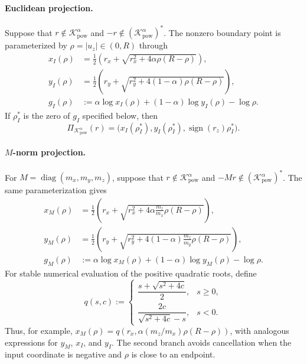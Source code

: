 \documentclass[letterpaper]{article} %
\theoremstyle{definition}
\theoremstyle{remark}
\begin{document}
\paragraph{Euclidean projection.}
Suppose that $r\notin\mathcal K_{\mathrm{pow}}^\alpha$ and
$-r\notin(\mathcal K_{\mathrm{pow}}^\alpha)^*$.
The nonzero boundary point is parameterized by
$\rho=|u_z|\in(0,R)$ through
\begin{equation}
\label{eq:power-euclidean-projection}
\begin{aligned}
    x_I(\rho)
    &=\frac12\left(
        r_x+\sqrt{r_x^2+4\alpha\rho(R-\rho)}
      \right),\\
    y_I(\rho)
    &=\frac12\left(
        r_y+\sqrt{r_y^2+4(1-\alpha)\rho(R-\rho)}
      \right),\\
    g_I(\rho)
    &:=\alpha\log x_I(\rho)
      +(1-\alpha)\log y_I(\rho)-\log\rho.
\end{aligned}
\end{equation}
If $\rho_I^*$ is the zero of $g_I$ specified below, then
\begin{equation}
\label{eq:power-euclidean-projection-recovery}
    \Pi_{\mathcal K_{\mathrm{pow}}^\alpha}(r)
    =\bigl(x_I(\rho_I^*),y_I(\rho_I^*),
      \operatorname{sign}(r_z)\rho_I^*\bigr).
\end{equation}

\paragraph{\texorpdfstring{$M$}{M}-norm projection.}
For $M=\operatorname{diag}(m_x,m_y,m_z)$, suppose that
$r\notin\mathcal K_{\mathrm{pow}}^\alpha$ and
$-Mr\notin(\mathcal K_{\mathrm{pow}}^\alpha)^*$. The same parameterization gives
\begin{equation}
\label{eq:power-projection-root}
\begin{aligned}
    x_M(\rho)
    &=\frac12\left(
        r_x+\sqrt{r_x^2
        +4\alpha\frac{m_z}{m_x}\rho(R-\rho)}
      \right),\\
    y_M(\rho)
    &=\frac12\left(
        r_y+\sqrt{r_y^2
        +4(1-\alpha)\frac{m_z}{m_y}\rho(R-\rho)}
      \right),\\
    g_M(\rho)
    &:=\alpha\log x_M(\rho)
      +(1-\alpha)\log y_M(\rho)-\log\rho.
\end{aligned}
\end{equation}
For stable numerical evaluation of the positive quadratic roots, define
\begin{equation}
\label{eq:power-cone-stable-quadratic-root}
    q(s,c):=
    \begin{cases}
        \dfrac{s+\sqrt{s^2+4c}}{2}, & s\ge0,\\[6pt]
        \dfrac{2c}{\sqrt{s^2+4c}-s}, & s<0.
    \end{cases}
\end{equation}
Thus, for example,
$x_M(\rho)=q(r_x,\alpha(m_z/m_x)\rho(R-\rho))$, with analogous expressions
for $y_M$, $x_I$, and $y_I$. The second branch avoids cancellation when the
input coordinate is negative and $\rho$ is close to an endpoint.
\end{document}
